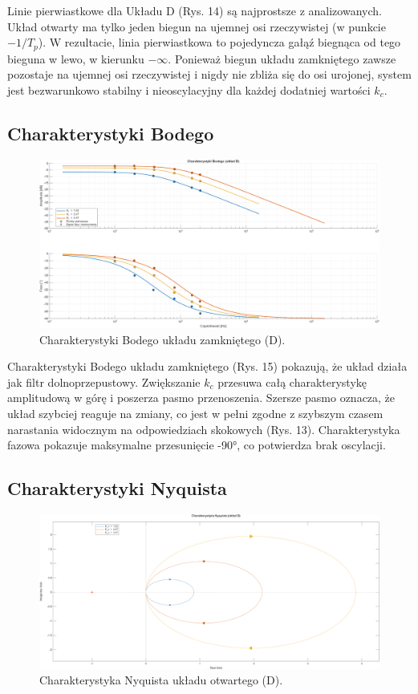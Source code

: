 \documentclass[12pt,a4paper]{article}
\begin{document}
	Linie pierwiastkowe dla Układu D (Rys. 14) są najprostsze z analizowanych. Układ otwarty ma tylko jeden biegun na ujemnej osi rzeczywistej (w punkcie $-1/T_p$). W rezultacie, linia pierwiastkowa to pojedyncza gałąź biegnąca od tego bieguna w lewo, w kierunku $-\infty$. Ponieważ biegun układu zamkniętego zawsze pozostaje na ujemnej osi rzeczywistej i nigdy nie zbliża się do osi urojonej, system jest bezwarunkowo stabilny i nieoscylacyjny dla każdej dodatniej wartości $k_c$.
	
	\subsection{Charakterystyki Bodego}
	
	\begin{figure}[H]
		\centering
		\includegraphics[width=1\linewidth]{zdjecia/Bode_ukladD.png}
		\caption{Charakterystyki Bodego układu zamkniętego (D).}
		\label{fig:Bode_ukladD}
	\end{figure}
	
	Charakterystyki Bodego układu zamkniętego (Rys. 15) pokazują, że układ działa jak filtr dolnoprzepustowy. Zwiększanie $k_c$ przesuwa całą charakterystykę amplitudową w górę i poszerza pasmo przenoszenia. Szersze pasmo oznacza, że układ szybciej reaguje na zmiany, co jest w pełni zgodne z szybszym czasem narastania widocznym na odpowiedziach skokowych (Rys. 13). Charakterystyka fazowa pokazuje maksymalne przesunięcie -90°, co potwierdza brak oscylacji.
	
	\subsection{Charakterystyki Nyquista}
	
	\begin{figure}[H]
		\centering
		\includegraphics[width=0.8\linewidth]{zdjecia/NQ_ukladD.png}
		\caption{Charakterystyka Nyquista układu otwartego (D).}
		\label{fig:NQ_ukladD}
	\end{figure}
	
\end{document}
